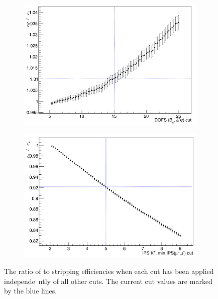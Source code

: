 \begin{figure}
    \begin{subfigure}[b]{0.4\textwidth}
        \includegraphics[width=\textwidth]{./Figs/Selection/DOFS.png}
        \caption{ }
        \label{fig:FD_ratioKPi}
    \end{subfigure}
   \begin{subfigure}[b]{0.4\textwidth}
        \includegraphics[width=\textwidth]{./Figs/Selection/daug_IPS.png}
        \caption{ }
        \label{fig:IPS_ratioKPi}
    \end{subfigure}
    \caption{The ratio of \bsmumu to \bdkpi stripping efficiencies when each cut has been applied independe\
ntly of all other cuts. The current cut values are marked by the blue lines.}
    \label{fig:ratio_plotsBd2KPi}
\end{figure}


